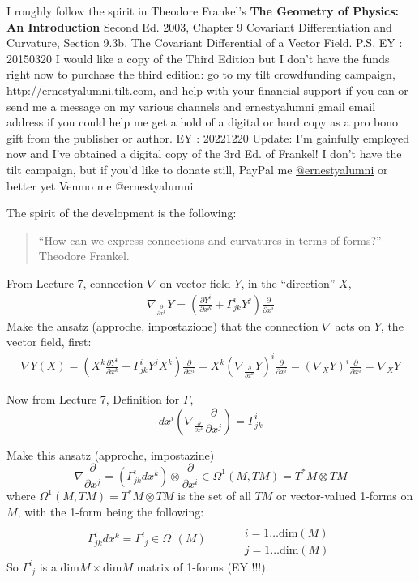 \documentclass[10pt]{amsart}
\begin{document}
\begin{multicols*}{2}
	I roughly follow the spirit in Theodore Frankel's \textbf{The Geometry of Physics: An Introduction} Second Ed. 2003, Chapter 9 Covariant Differentiation and Curvature, Section 9.3b. The Covariant Differential of a Vector Field. P.S. EY : 20150320 I would like a copy of the Third Edition but I don't have the funds right now to purchase the third edition: go to my tilt crowdfunding campaign, \url{http://ernestyalumni.tilt.com}, and help with your financial support if you can or send me a message on my various channels and ernestyalumni gmail email address if you could help me get a hold of a digital or hard copy as a pro bono gift from the publisher or author.  EY : 20221220 Update: I'm gainfully employed now and I've obtained a digital copy of the 3rd Ed. of Frankel! I don't have the tilt campaign, but if you'd like to donate still, PayPal me \href{mailto:ernestyalumni@gmail.com}{@ernestyalumni} or better yet Venmo me @ernestyalumni
	
	The spirit of the development is the following:
	\begin{quote}
		``How can we express connections and curvatures in terms of forms?'' -Theodore Frankel.  
	\end{quote}
	
	From Lecture 7, connection $\nabla$ on vector field $Y$, in the ``direction'' $X$,
	\[
	\begin{gathered}
	\nabla_{ \frac{ \partial }{ \partial x^k } } Y = \left( \frac{ \partial Y^i }{ \partial x^k } + \Gamma^i_{jk} Y^j  \right) \frac{ \partial }{ \partial x^i }
	\end{gathered}
	\]
	Make the ansatz (approche, impostazione) that the connection $\nabla$ acts on $Y$, the vector field, first:
	\[
	\begin{gathered}
	\nabla Y(X) = \left( X^k \frac{ \partial Y^i}{ \partial x^k} + \Gamma^i_{jk} Y^j X^k \right) \frac{ \partial}{ \partial x^i } = X^k \left( \nabla_{ \frac{ \partial }{ \partial x^k} } Y \right)^i \frac{ \partial }{ \partial x^i} = (\nabla_X Y)^i \frac{ \partial}{ \partial x^i} = \nabla_XY
	\end{gathered}
	\]
	
	Now from Lecture 7, Definition for $\Gamma$, 
	\[
	dx^i \left( \nabla_{ \frac{  \partial }{ \partial x^k } } \frac{ \partial }{ \partial x^j } \right) = \Gamma^i_{jk}
	\]
	
	Make this ansatz (approche, impostazine)
	\[
	\nabla \frac{ \partial}{ \partial x^j } = \left( \Gamma^i_{jk} dx^k \right) \otimes \frac{ \partial }{ \partial x^i} \in \Omega^1(M,TM) = T^*M \otimes TM
	\]
	where $\Omega^1(M,TM) = T^*M \otimes TM$ is the set of all $TM$ or vector-valued 1-forms on $M$, with the 1-form being the following:
	\[
	\Gamma^i_{jk} dx^k = \Gamma^i_{ \, \, j } \in \Omega^1(M) \quad \quad \, \begin{aligned}
	& \quad \\
	& i = 1 \dots \text{dim}(M) \\ 
	& j = 1\dots \text{dim}(M) \end{aligned}
	\]
	So $\Gamma^i_{ \, \, j}$ is a $\text{dim}M \times \text{dim}M$ matrix of 1-forms (EY !!!). 
	

\end{multicols*}
\end{document}
